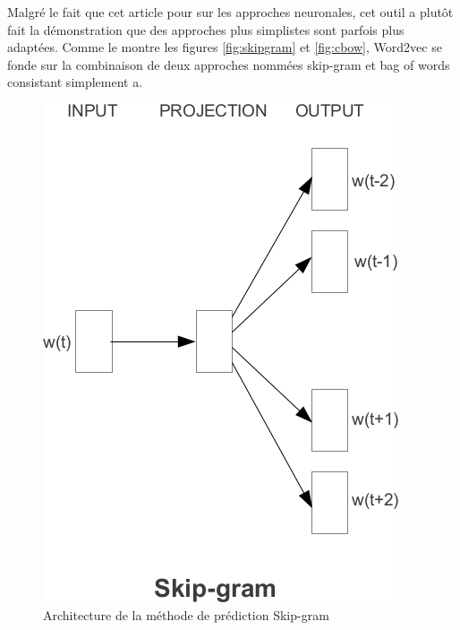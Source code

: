 \documentclass[11pt]{article}
\begin{document}
Malgré le fait que cet article pour sur les approches neuronales, cet outil a plutôt fait la démonstration que des approches plus simplistes sont parfois plus adaptées. Comme le montre les figures \autoref{fig:skipgram} et \autoref{fig:cbow}, Word2vec se fonde sur la combinaison de deux approches nommées skip-gram et bag of words consistant simplement a. \\

\begin{figure}[ht]
  \centering
  \includegraphics[width=\columnwidth]{skipgram}
  \caption{Architecture de la méthode de prédiction Skip-gram}
  \label{fig:skipgram}
\end{figure}
\end{document}
